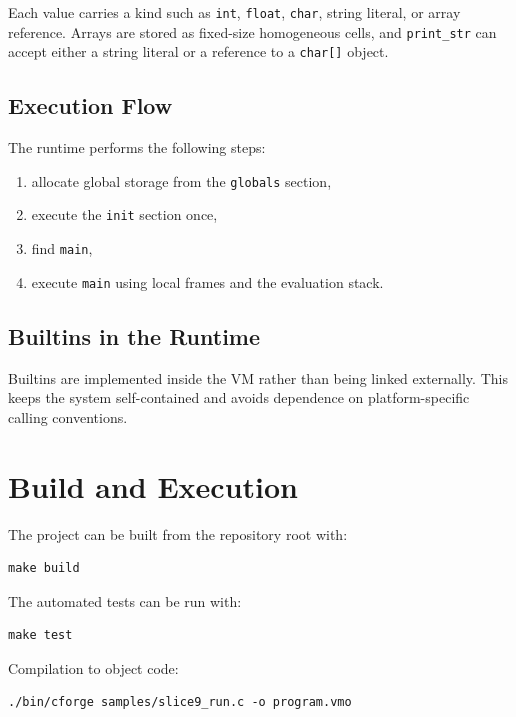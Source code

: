 \documentclass[11pt,a4paper]{article}
\begin{document}
Each value carries a kind such as \texttt{int}, \texttt{float}, \texttt{char},
string literal, or array reference. Arrays are stored as fixed-size homogeneous
cells, and \texttt{print\_str} can accept either a string literal or a reference
to a \texttt{char[]} object.

\subsection*{Execution Flow}

The runtime performs the following steps:

\begin{enumerate}[leftmargin=2em]
    \item allocate global storage from the \texttt{globals} section,
    \item execute the \texttt{init} section once,
    \item find \texttt{main},
    \item execute \texttt{main} using local frames and the evaluation stack.
\end{enumerate}

\subsection*{Builtins in the Runtime}

Builtins are implemented inside the VM rather than being linked externally. This
keeps the system self-contained and avoids dependence on platform-specific
calling conventions.

\section{Build and Execution}

The project can be built from the repository root with:

\begin{lstlisting}
make build
\end{lstlisting}

The automated tests can be run with:

\begin{lstlisting}
make test
\end{lstlisting}

Compilation to object code:

\begin{lstlisting}
./bin/cforge samples/slice9_run.c -o program.vmo
\end{lstlisting}
\end{document}
